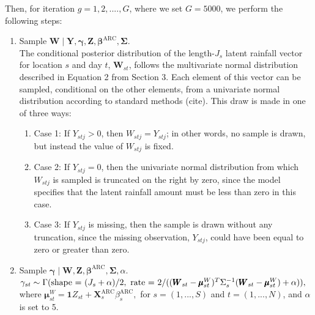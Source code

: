 \documentclass[12pt]{article}
\def\bbeta{\pmb{\beta}}
\def\bgamma{\pmb{\gamma}}
\def\bmu{\pmb{\mu}}
\def\bSigma{\pmb{\Sigma}}
\def\bX{\pmb{X}}
\def\bY{\pmb{Y}}
\def\bZ{\pmb{Z}}
\def\bW{\pmb{W}}
\begin{document}
Then, for iteration $g = 1, 2, ...., G$, where we set $G = 5000$, we perform the following steps:
\begin{enumerate}
\item Sample $\bW \mid \bY, \bgamma, \bZ, \bbeta^\text{ARC}, \bSigma$.\\
The conditional posterior distribution of the length-$J_s$ latent rainfall vector for location $s$ and day $t$, $\bW_{st}$, follows the multivariate normal distribution described in Equation 2 from Section 3. Each element of this vector can be sampled, conditional on the other elements, from a univariate normal distribution according to standard methods (cite). This draw is made in one of three ways:
\begin{enumerate}
\item Case 1: If $Y_{stj} > 0$, then $W_{stj} = Y_{stj}$; in other words, no sample is drawn, but instead the value of $W_{stj}$ is fixed.
\item Case 2: If $Y_{stj} = 0$, then the univariate normal distribution from which $W_{stj}$ is sampled  is truncated on the right by zero, since the model specifies that the latent rainfall amount must be less than zero in this case.
\item Case 3: If $Y_{stj}$ is missing, then the sample is drawn without any truncation, since the missing observation, $Y_{stj}$, could have been equal to zero or greater than zero.
\end{enumerate}

\item Sample $\bgamma \mid \bW, \bZ, \bbeta^\text{ARC}, \bSigma, \alpha$. \\
$
\gamma_{st} \sim \Gamma(\text{shape = }(J_s + \alpha)/2, \text{ rate = }2/((\bW_{st} - \bmu^W_{st})^T\Sigma_s^{-1}(\bW_{st} - \bmu^W_{st}) + \alpha)),\\
$ where
$
\bmu^W_{st} = \mathbf{1}Z_{st} + \bX_{s}^\text{ARC}\beta_s^\text{ARC},
$
for $s = (1, ..., S)$ and $t = (1, ..., N)$, and $\alpha$ is set to 5.


\end{enumerate}
\end{document}
